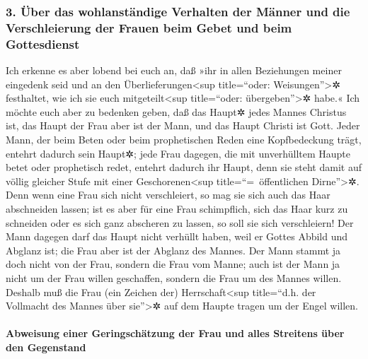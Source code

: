 \hypertarget{uxfcber-das-wohlanstuxe4ndige-verhalten-der-muxe4nner-und-die-verschleierung-der-frauen-beim-gebet-und-beim-gottesdienst}{%
\subsubsection{3. Über das wohlanständige Verhalten der Männer und die
Verschleierung der Frauen beim Gebet und beim
Gottesdienst}\label{uxfcber-das-wohlanstuxe4ndige-verhalten-der-muxe4nner-und-die-verschleierung-der-frauen-beim-gebet-und-beim-gottesdienst}}

 Ich erkenne es aber lobend bei euch an, daß »ihr in allen
Beziehungen meiner eingedenk seid und an den
Überlieferungen\textless sup title=``oder: Weisungen''\textgreater✲
festhaltet, wie ich sie euch mitgeteilt\textless sup title=``oder:
übergeben''\textgreater✲ habe.«  Ich möchte euch aber zu
bedenken geben, daß das Haupt✲ jedes Mannes Christus ist, das Haupt der
Frau aber ist der Mann, und das Haupt Christi ist Gott. 
Jeder Mann, der beim Beten oder beim prophetischen Reden eine
Kopfbedeckung trägt, entehrt dadurch sein Haupt✲;  jede
Frau dagegen, die mit unverhülltem Haupte betet oder prophetisch redet,
entehrt dadurch ihr Haupt, denn sie steht damit auf völlig gleicher
Stufe mit einer Geschorenen\textless sup title=``=~öffentlichen
Dirne''\textgreater✲.  Denn wenn eine Frau sich nicht
verschleiert, so mag sie sich auch das Haar abschneiden lassen; ist es
aber für eine Frau schimpflich, sich das Haar kurz zu schneiden oder es
sich ganz abscheren zu lassen, so soll sie sich verschleiern!
 Der Mann dagegen darf das Haupt nicht verhüllt haben,
weil er Gottes Abbild und Abglanz ist; die Frau aber ist der Abglanz des
Mannes.  Der Mann stammt ja doch nicht von der Frau,
sondern die Frau vom Manne;  auch ist der Mann ja nicht um
der Frau willen geschaffen, sondern die Frau um des Mannes willen.
 Deshalb muß die Frau (ein Zeichen der)
Herrschaft\textless sup title=``d.h. der Vollmacht des Mannes über
sie''\textgreater✲ auf dem Haupte tragen um der Engel willen.

\hypertarget{abweisung-einer-geringschuxe4tzung-der-frau-und-alles-streitens-uxfcber-den-gegenstand}{%
\paragraph{Abweisung einer Geringschätzung der Frau und alles Streitens
über den
Gegenstand}\label{abweisung-einer-geringschuxe4tzung-der-frau-und-alles-streitens-uxfcber-den-gegenstand}}

